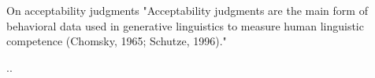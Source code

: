 On acceptability judgments
"Acceptability judgments are the main form of behavioral data used in generative linguistics to measure human linguistic competence (Chomsky, 1965; Schutze, 1996)." \citep{warstadt2020blimp}	

..







